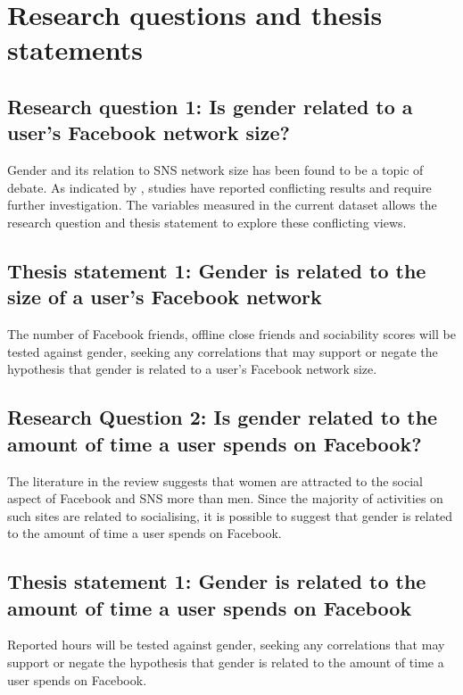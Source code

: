 \section{Research questions and thesis statements}

\subsection{Research question 1: Is gender related to a user's Facebook network size?}

Gender and its relation to SNS network size has been found to be a topic of debate. As indicated by \citet{Tifferet2014}, studies have reported conflicting results and require further investigation. The variables measured in the current dataset allows the research question and thesis statement to explore these conflicting views.

\subsection{Thesis statement 1: Gender is related to the size of a user's Facebook network}

The number of Facebook friends, offline close friends and sociability scores will be tested against gender, seeking any correlations that may support or negate the hypothesis that gender is related to a user's Facebook network size. 

\subsection{Research Question 2: Is gender related to the amount of time a user spends on Facebook?}

The literature in the review suggests that women are attracted to the social aspect of Facebook and SNS more than men. Since the majority of activities on such sites are related to socialising, it is possible to suggest that gender is related to the amount of time a user spends on Facebook.

\subsection{Thesis statement 1: Gender is related to the amount of time a user spends on Facebook}

Reported hours will be tested against gender, seeking any correlations that may support or negate the hypothesis that gender is related to the amount of time a user spends on Facebook.